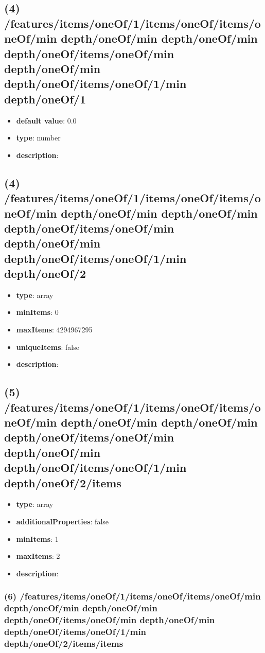 \subsection{(4) /features/items/oneOf/1/items/oneOf/items/oneOf/min depth/oneOf/min depth/oneOf/min depth/oneOf/items/oneOf/min depth/oneOf/min depth/oneOf/items/oneOf/1/min depth/oneOf/1}
\begin{itemize}[leftmargin=4em]\item {\bf default value}: 0.0
\item {\bf type}: number
\item {\bf description}: 
\end{itemize}\subsection{(4) /features/items/oneOf/1/items/oneOf/items/oneOf/min depth/oneOf/min depth/oneOf/min depth/oneOf/items/oneOf/min depth/oneOf/min depth/oneOf/items/oneOf/1/min depth/oneOf/2}
\begin{itemize}[leftmargin=4em]\item {\bf type}: array
\item {\bf minItems}: 0
\item {\bf maxItems}: 4294967295
\item {\bf uniqueItems}: false
\item {\bf description}: 
\end{itemize}\subsection{(5) /features/items/oneOf/1/items/oneOf/items/oneOf/min depth/oneOf/min depth/oneOf/min depth/oneOf/items/oneOf/min depth/oneOf/min depth/oneOf/items/oneOf/1/min depth/oneOf/2/items}
\begin{itemize}[leftmargin=5em]\item {\bf type}: array
\item {\bf additionalProperties}: false
\item {\bf minItems}: 1
\item {\bf maxItems}: 2
\item {\bf description}: 
\end{itemize}\subsubsection{(6) /features/items/oneOf/1/items/oneOf/items/oneOf/min depth/oneOf/min depth/oneOf/min depth/oneOf/items/oneOf/min depth/oneOf/min depth/oneOf/items/oneOf/1/min depth/oneOf/2/items/items}
